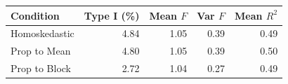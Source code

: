 
\begin{tabular}{lrrrr}
\toprule
Condition & Type I (\%) & Mean $F$ & Var $F$ & Mean $R^2$\\
\midrule
Homoskedastic & 4.84 & 1.05 & 0.39 & 0.49\\
Prop to Mean & 4.80 & 1.05 & 0.39 & 0.50\\
Prop to Block & 2.72 & 1.04 & 0.27 & 0.49\\
\bottomrule
\end{tabular}
